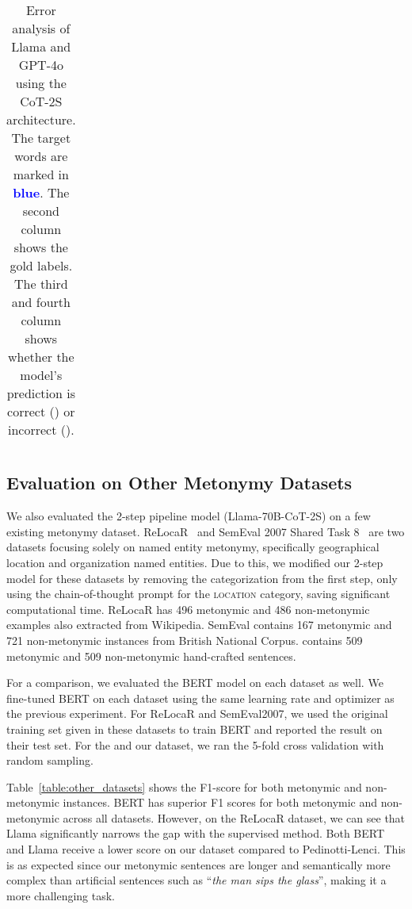 \documentclass[11pt]{article}
\newcommand{\cmark}{\ding{51}}%
\newcommand{\xmark}{\ding{55}}%
\newcommand{\tr}[1]{\textcolor{red}{#1}}
\newcommand{\tg}[1]{\textcolor{darkgreen}{#1}}
\newcommand{\tb}[1]{\textcolor{blue}{#1}}
\begin{document}
\begin{table*}[ht]
{\begin{NiceTabular}{p{0.85\linewidth}|c|c|c}
    \end{NiceTabular}
    }
    \caption{Error analysis of Llama and GPT-4o using the CoT-2S architecture. The target words are marked in \textbf{\tb{blue}}. The second column shows the gold labels. The third and fourth column shows whether the model's prediction is correct (\tg{\cmark}) or incorrect (\tr{\xmark}).}
    \label{tab:error_case}
\end{table*}
\endgroup

\subsection{Evaluation on Other Metonymy Datasets}

We also evaluated the 2-step pipeline model (Llama-70B-CoT-2S) on a few existing metonymy dataset. ReLocaR~\citep{gritta-etal-2017-vancouver} and SemEval 2007 Shared Task 8~\citep{markert-nissim-2007-semeval} are two datasets focusing solely on named entity metonymy, specifically geographical location and organization named entities. Due to this, we modified our 2-step model for these datasets by removing the categorization from the first step, only using the chain-of-thought prompt for the \textsc{location} category, saving significant computational time. ReLocaR has 496 metonymic and 486 non-metonymic examples also extracted from Wikipedia. SemEval contains 167 metonymic and 721 non-metonymic instances from British National Corpus. \citet{pedinotti-lenci-2020-dont} contains 509 metonymic and 509 non-metonymic hand-crafted sentences.

For a comparison, we evaluated the BERT model on each dataset as well. We fine-tuned BERT on each dataset using the same learning rate and optimizer as the previous experiment. For ReLocaR and SemEval2007, we used the original training set given in these datasets to train BERT and reported the result on their test set. For the \citet{pedinotti-lenci-2020-dont} and our dataset, we ran the 5-fold cross validation with random sampling.

Table~\ref{table:other_datasets} shows the F1-score for both metonymic and non-metonymic instances. BERT has superior F1 scores for both metonymic and non-metonymic across all datasets. However, on the ReLocaR dataset, we can see that Llama significantly narrows the gap with the supervised method. Both BERT and Llama receive a lower score on our dataset compared to Pedinotti-Lenci. This is as expected since our metonymic sentences are longer and semantically more complex than artificial sentences such as ``\textit{the man sips the glass}'', making it a more challenging task.
\end{document}
